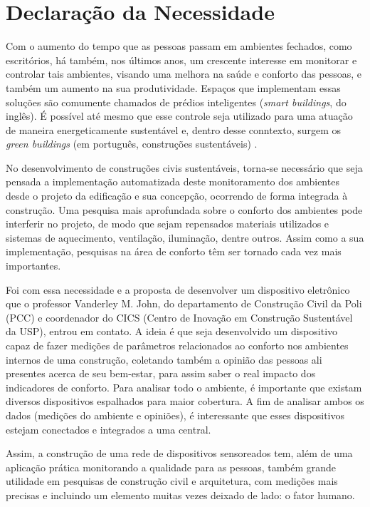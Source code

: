 \documentclass[../monografia.tex]{subfiles}
\begin{document}
\section{Declaração da Necessidade}

Com o aumento do tempo que as pessoas passam em ambientes fechados, como escritórios, há também, nos últimos anos, um crescente interesse em monitorar e controlar tais ambientes, visando uma melhora na saúde e conforto das pessoas, e também um aumento na sua produtividade. Espaços que implementam essas soluções são comumente chamados de prédios inteligentes (\textit{smart buildings}, do inglês). É possível até mesmo que esse controle seja utilizado para uma atuação de maneira energeticamente sustentável e, dentro desse conntexto, surgem os \textit{green buildings} (em português, construções sustentáveis) \cite{GreenBuildings} \cite{EnergyBuildings}.

No desenvolvimento de construções civis sustentáveis, torna-se necessário que seja pensada a implementação automatizada deste monitoramento dos ambientes desde o projeto da edificação e sua concepção, ocorrendo de forma integrada à construção. Uma pesquisa mais aprofundada sobre o conforto dos ambientes pode interferir no projeto, de modo que sejam repensados materiais utilizados e sistemas de aquecimento, ventilação, iluminação, dentre outros. Assim como a sua implementação, pesquisas na área de conforto têm ser tornado cada vez mais importantes. 

Foi com essa necessidade e a proposta de desenvolver um dispositivo eletrônico que o professor Vanderley M. John, do departamento de Construção Civil da Poli (PCC) e coordenador do CICS (Centro de Inovação em Construção Sustentável da USP)\cite{CICS}, entrou em contato. A ideia é que seja desenvolvido um dispositivo capaz de fazer medições de parâmetros relacionados ao conforto nos ambientes internos de uma construção, coletando também a opinião das pessoas ali presentes acerca de seu bem-estar, para assim saber o real impacto dos indicadores de conforto. Para analisar todo o ambiente, é importante que existam diversos dispositivos espalhados para maior cobertura. A fim de analisar ambos os dados (medições do ambiente e opiniões), é interessante que esses dispositivos estejam conectados e integrados a uma central. 

Assim, a construção de uma rede de dispositivos sensoreados tem, além de uma aplicação prática monitorando a qualidade para as pessoas, também grande utilidade em pesquisas de construção civil e arquitetura, com medições mais precisas e incluindo um elemento muitas vezes deixado de lado: o fator humano.
\end{document}
